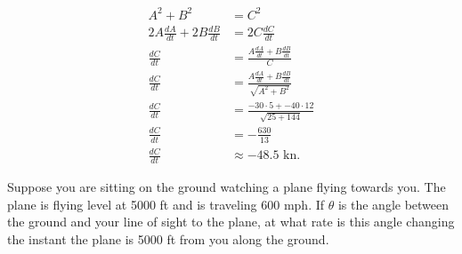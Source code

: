 \documentclass{hwset}
\begin{document}
\begin{solution}
	\begin{center}
	\end{center}
	\begin{align*}
		A^2 + B^2 &= C^2 \\
		2A \frac{dA}{dt} + 2B \frac{dB}{dt} &= 2C \frac{dC}{dt} \\
		\frac{dC}{dt} &= \frac{A \frac{dA}{dt} + B \frac{dB}{dt}}{C} \\
		\frac{dC}{dt} &= \frac{A \frac{dA}{dt} + B
			\frac{dB}{dt}}{\sqrt{A^2 + B^2}} \\
		\frac{dC}{dt} &= \frac{-30 \cdot 5 + -40 \cdot 12}{\sqrt{25 + 144}} \\
		\frac{dC}{dt} &= -\frac{630}{13} \\
		\frac{dC}{dt} &\approx \boxed{-48.5 \text{ kn}}.
	\end{align*}
\end{solution}

\begin{problem}[4.]
	Suppose you are sitting on the ground watching a plane flying towards you. The
	plane is flying level at 5000 ft and is traveling 600 mph. If $\theta$ is the
	angle between the ground and your line of sight to the plane, at what rate is
	this angle changing the instant the plane is 5000 ft from you along the
	ground.
\end{problem}
\end{document}
